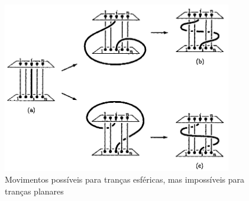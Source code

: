 	\begin{figure}[H]
		\begin{center}
			\includegraphics[width=10cm]{Images/movimentos_trancas_esfericas.png}
		\end{center}\caption{Movimentos possíveis para tranças esféricas, mas impossíveis para tranças planares}
		\label{movimentos trancas esfericas}
	\end{figure} 
	
